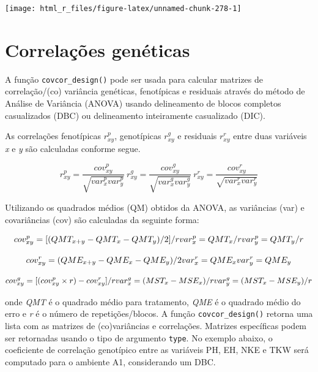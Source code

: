 \documentclass[
]{book}
\begin{document}
\begin{center}\texttt{[image: html\_r\_files/figure-latex/unnamed-chunk-278-1]} \end{center}

\hypertarget{correlauxe7uxf5es-genuxe9ticas}{%
\section{Correlações genéticas}\label{correlauxe7uxf5es-genuxe9ticas}}

A função \texttt{covcor\_design()} pode ser usada para calcular matrizes de correlação/(co) variância genéticas, fenotípicas e residuais através do método de Análise de Variância (ANOVA) usando delineamento de blocos completos casualizados (DBC) ou delineamento inteiramente casualizado (DIC).

As correlações fenotípicas \(r^p_{xy}\), genotípicas \(r^g_{xy}\) e residuais \(r^r_{xy}\) entre duas variáveis \emph{x} e \emph{y} são calculadas conforme segue.

\[
r^p_{xy} = \frac{cov^p_{xy}}{\sqrt{var^p_{x}var^p_{y}}} \
r^g_{xy} = \frac{cov^g_{xy}}{\sqrt{var^g_{x}var^g_{y}}} \
r^r_{xy} = \frac{cov^r_{xy}}{\sqrt{var^r_{x}var^r_{y}}}
\]

Utilizando os quadrados médios (QM) obtidos da ANOVA, as variâncias (var) e covariâncias (cov) são calculadas da seguinte forma:

\[
cov^p_{xy} = [(QMT_{x+y} -QMT_x -QMT_y)/2]/r \\
var^p_x =QMT_x / r \\
var^p_y =QMT_y / r
\]

\[
cov^r_{xy} = (QME_{x+y} - QME_x - QME_y)/2 \\
var^r_x = QME_x \\
var^r_y = QME_y
\]

\[
cov^g_{xy} = [(cov^p_{xy} \times r) - cov^r_{xy}]/r \\
var^g_x = (MST_x - MSE_x)/r \\
var^g_y = (MST_x - MSE_y)/r
\]

onde \emph{QMT} é o quadrado médio para tratamento, \emph{QME} é o quadrado médio do erro e \emph{r} é o número de repetições/blocos. A função \texttt{covcor\_design()}  retorna uma lista com as matrizes de (co)variâncias e correlações. Matrizes específicas podem ser retornadas usando o tipo de argumento \texttt{type}. No exemplo abaixo, o coeficiente de correlação genotípico entre as variáveis PH, EH, NKE e TKW será computado para o ambiente A1, considerando um DBC.
\end{document}
